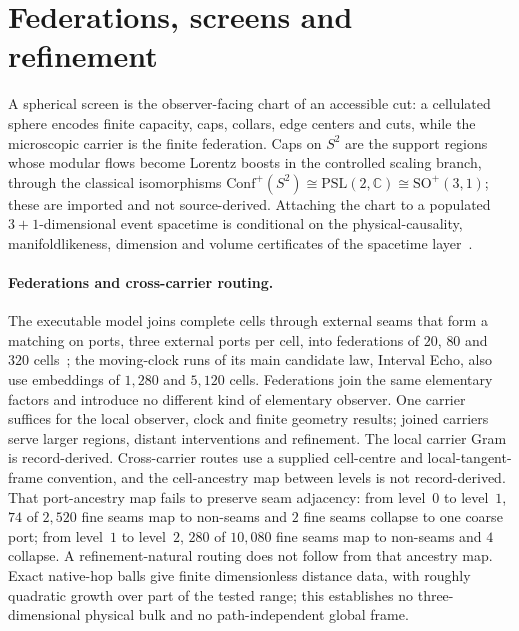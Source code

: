 \documentclass[11pt]{article}
\theoremstyle{remark}
\theoremstyle{plain}
\begin{document}
\section{Federations, screens and refinement}
\label{sec:federations-screens}

A spherical screen is the observer-facing chart of an accessible cut: a
cellulated sphere encodes finite capacity, caps, collars, edge centers and
cuts, while the microscopic carrier is the finite federation. Caps on
\(S^2\) are the support regions whose modular flows become Lorentz boosts in
the controlled scaling branch, through the classical isomorphisms
\(\mathrm{Conf}^+(S^2)\cong\mathrm{PSL}(2,\mathbb C)\cong\mathrm{SO}^+(3,1)\);
these are imported and not source-derived. Attaching the chart to a
populated \(3+1\)-dimensional event spacetime is conditional on the
physical-causality, manifoldlikeness, dimension and volume certificates of
the spacetime layer~\cite{ophEinstein}.

\paragraph{Federations and cross-carrier routing.}
The executable model joins complete cells through external seams that form a
matching on ports, three external ports per cell, into federations of
\(20\), \(80\) and \(320\) cells~\cite{ophmodel}; the moving-clock runs of
its main candidate law, Interval Echo, also use embeddings of \(1{,}280\)
and \(5{,}120\) cells. Federations join the
same elementary factors and introduce no different kind of elementary
observer. One carrier suffices for the local observer, clock and finite
geometry results; joined carriers serve larger regions, distant
interventions and refinement. The local carrier Gram is record-derived.
Cross-carrier routes use a supplied cell-centre and local-tangent-frame
convention, and the cell-ancestry map between levels is not record-derived.
That port-ancestry map fails to preserve seam adjacency: from level~\(0\) to
level~\(1\), \(74\) of \(2{,}520\) fine seams map to non-seams and \(2\) fine
seams collapse to one coarse port; from level~\(1\) to level~\(2\), \(280\)
of \(10{,}080\) fine seams map to non-seams and \(4\) collapse. A
refinement-natural routing does not follow from that ancestry map. Exact native-hop balls give finite dimensionless distance data, with
roughly quadratic growth over part of the tested range; this establishes no
three-dimensional physical bulk and no path-independent global frame.
\end{document}
